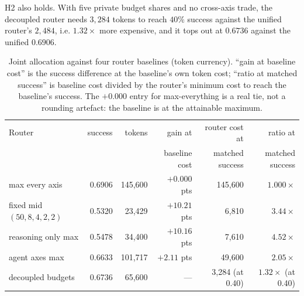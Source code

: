 \documentclass[10pt]{article} %
\begin{document}
H2 also holds. With five private budget shares and no cross-axis trade, the
decoupled router needs $3{,}284$ tokens to reach $40\%$ success against the
unified router's $2{,}484$, i.e. $1.32\times$ more expensive, and it tops out at
$0.6736$ against the unified $0.6906$.

\begin{table}[t]
\caption{Joint allocation against four router baselines (token currency).
``gain at baseline cost'' is the success difference at the baseline's own token
cost; ``ratio at matched success'' is baseline cost divided by the router's
minimum cost to reach the baseline's success. The $+0.000$ entry for
max-everything is a real tie, not a rounding artefact: the baseline is at the
attainable maximum.}
\label{tab:e2}
\begin{center}
\small
\begin{tabular}{lrrrrr}
\toprule
Router & success & tokens & gain at & router cost at & ratio at \\
       &         &        & baseline cost & matched success & matched success \\
\midrule
max every axis      & 0.6906 & 145{,}600 & $+0.000$ pts & 145{,}600 & $1.000\times$ \\
fixed mid $(50,8,4,2,2)$ & 0.5320 & 23{,}429 & $+10.21$ pts & 6{,}810 & $3.44\times$ \\
reasoning only max  & 0.5478 & 34{,}400 & $+10.16$ pts & 7{,}610 & $4.52\times$ \\
agent axes max      & 0.6633 & 101{,}717 & $+2.11$ pts & 49{,}600 & $2.05\times$ \\
decoupled budgets   & 0.6736 & 65{,}600 & --- & 3{,}284 (at 0.40) & $1.32\times$ (at 0.40) \\
\bottomrule
\end{tabular}
\end{center}
\end{table}
\end{document}
